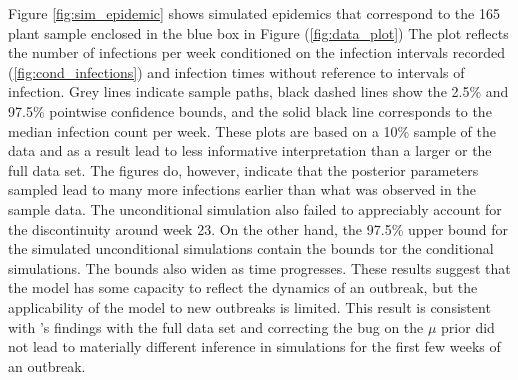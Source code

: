 \documentclass{uwstat572}
\begin{document}
Figure \ref{fig:sim_epidemic} shows simulated epidemics that correspond to the 165 plant sample enclosed in the blue box in Figure (\ref{fig:data_plot})
The plot reflects the number of infections per week conditioned on the infection intervals recorded (\ref{fig:cond_infections}) and infection times without reference to intervals of infection. 
Grey lines indicate sample paths, black dashed lines show the 2.5\% and 97.5\% pointwise confidence bounds, and the solid black line corresponds to the median infection count per week. 
These plots are based on a 10\% sample of the data and as a result lead to less informative interpretation than a larger or the full data set. 
The figures do, however, indicate that the posterior parameters sampled lead to many more infections earlier than what was observed in the sample data. 
The unconditional simulation also failed to appreciably account for the discontinuity around week 23. 
On the other hand, the 97.5\% upper bound for the simulated unconditional simulations contain the bounds tor the conditional simulations. 
The bounds also widen as time progresses. 
These results suggest that the model has some capacity to reflect the dynamics of an outbreak, but the applicability of the model to new outbreaks is limited.
This result is consistent with \citet{Brown}'s findings with the full data set and correcting the bug on the $\mu$ prior did not lead to materially different inference in simulations for the first few weeks of an outbreak. 
\end{document}
